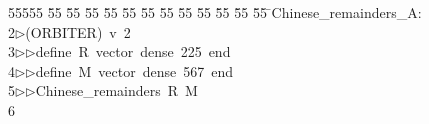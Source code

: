 %
%
\begin{tabbing}
55555 \= 55 \= 55 \= 55 \= 55 \= 55 \= 55 \= 55 \= 55 \= 55 \= 55 \= 55 \= 55 \= \>Chinese\_remainders\_A:\\[0pt]
2\>$\triangleright$\>(ORBITER)\ v\ 2\ \\[0pt]
3\>$\triangleright$\>$\triangleright$\>define\ R\ vector\ dense\ 225\ end\ \\[0pt]
4\>$\triangleright$\>$\triangleright$\>define\ M\ vector\ dense\ 567\ end\ \\[0pt]
5\>$\triangleright$\>$\triangleright$\>Chinese\_remainders\ R\ M\\[0pt]
6\>\end{tabbing}

